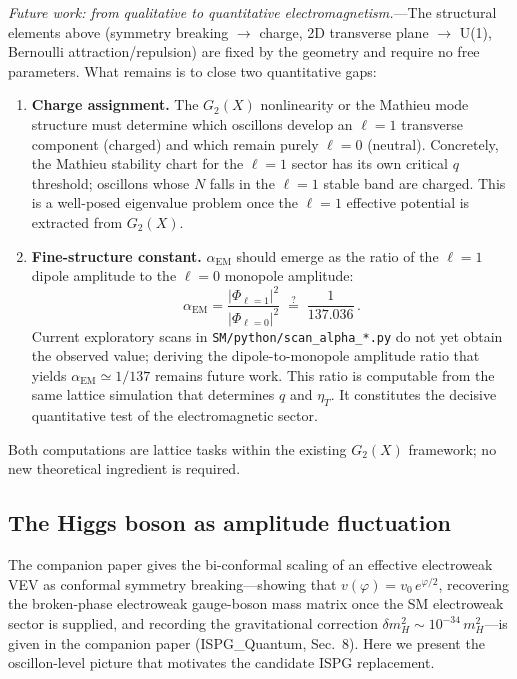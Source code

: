 \documentclass[11pt]{article}
\begin{document}
\textit{Future work: from qualitative to
quantitative electromagnetism.}---The structural
elements above (symmetry breaking $\to$ charge,
2D transverse plane $\to$ U(1), Bernoulli
attraction/repulsion) are fixed by the geometry
and require no free parameters.  What remains is
to close two quantitative gaps:

\begin{enumerate}
\item \textbf{Charge assignment.}\;
  The $G_2(X)$ nonlinearity or the Mathieu mode
  structure must determine which oscillons develop
  an $\ell = 1$ transverse component (charged)
  and which remain purely $\ell = 0$ (neutral).
  Concretely, the Mathieu stability chart for
  the $\ell = 1$ sector has its own critical $q$
  threshold; oscillons whose $N$ falls in the
  $\ell = 1$ stable band are charged.  This is a
  well-posed eigenvalue problem once the
  $\ell = 1$ effective potential is extracted
  from $G_2(X)$.

\item \textbf{Fine-structure constant.}\;
  $\alpha_{\mathrm{EM}}$ should emerge as the ratio of the
  $\ell = 1$ dipole amplitude to the $\ell = 0$
  monopole amplitude:
  \begin{equation}\label{eq:alpha_target}
    \alpha_{\mathrm{EM}}
    = \frac{|\Phi_{\ell=1}|^2}
           {|\Phi_{\ell=0}|^2}
    \;\stackrel{?}{=}\;
    \frac{1}{137.036}\,.
  \end{equation}
  Current exploratory scans in
  \texttt{SM/python/scan\_alpha\_*.py} do not yet obtain
  the observed value; deriving the dipole-to-monopole
  amplitude ratio that yields
  $\alpha_{\mathrm{EM}}\simeq 1/137$ remains future work.
  This ratio is computable from the same lattice
  simulation that determines $q$ and $\eta_T$.
  It constitutes the decisive quantitative test
  of the electromagnetic sector.
\end{enumerate}

Both computations are lattice tasks within the
existing $G_2(X)$ framework; no new theoretical
ingredient is required.

\subsection{The Higgs boson as amplitude
fluctuation}
\label{sec:higgs}

The companion paper gives the bi-conformal scaling of an
effective electroweak VEV
\cite{Higgs1964,EnglertBrout1964,Guralnik1964,Goldstone1961,ColemanWeinberg1973}
as conformal symmetry breaking---showing that
$v(\varphi) = v_0\,e^{\varphi/2}$, recovering
the broken-phase electroweak gauge-boson mass matrix
once the SM electroweak sector is supplied, and recording
the gravitational correction
$\delta m_H^2 \sim 10^{-34}\,m_H^2$---is given
in the companion paper \cite{Lotishvili2026Q} (ISPG\_Quantum, Sec.~8).
Here we present the oscillon-level picture that
motivates the candidate ISPG replacement.
\end{document}
